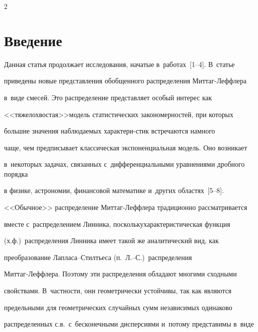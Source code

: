 \begin{multicols}{2}





\label{st\stat}





\section{Введение}





Данная статья продолжает исследования, начатые в~работах~[1--4]. В~статье 


приведены новые представления обобщенного распределения Мит\-таг-Леф\-фле\-ра 


в~виде смесей. Это распределение представляет особый интерес как 


<<тяжелохвостая>>\linebreak модель статистических закономерностей, при которых 


большие значения наблюдаемых характери-\linebreak стик встречаются намного 


чаще, чем предписывает классическая экспоненциальная модель. Оно возникает 


в~некоторых задачах, связанных с~дифференциальными уравнениями дробного порядка 


в физике, астрономии, финансовой математике и~других областях~[5--8]. 


<<Обычное>> распределение Мит\-таг-Леф\-фле\-ра традиционно рассматривается 


вместе с~распределением Линника, поскольку\linebreak характеристическая функция 


(х.ф.)\ распределения Линника имеет такой же аналитический вид, как 


преобразование Лап\-ла\-са--Стилть\-еса (п.~Л.--С.)\ распределения 


Мит\-таг-Леф\-фле\-ра. Поэтому эти распределения обладают многими сходными 


свойствами. В~частности, они геометрически устойчивы, так как являются 


предельными для геометрических случайных сумм независимых одинаково 


распределенных с.в.\ с~бесконечными дисперсиями и~потому представимы в~виде 



\end{multicols}
